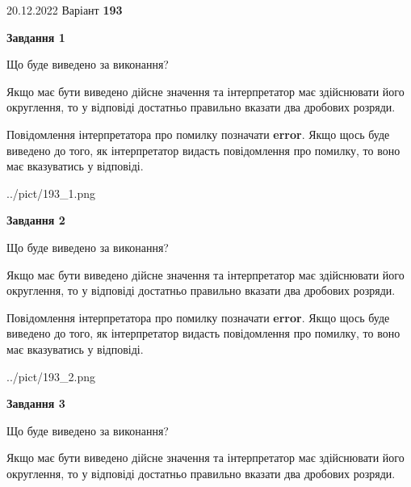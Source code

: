 \documentclass[12pt, ukrainian]{article}
\begin{document}
{20.12.2022 Варіант \No \textbf { 193 }\par}
{
\begin {Large}

{\begin {center}\textbf{Завдання 1}\end {center}}\par
Що буде виведено за виконання? \par

Якщо має бути виведено дійсне значення та інтерпретатор має здійснювати його округлення, 
то у відповіді достатньо правильно вказати два дробових розряди.

Повідомлення інтерпретатора про помилку позначати \textbf{error}.
Якщо щось буде виведено до того, як інтерпретатор видасть повідомлення про помилку, 
то воно має вказуватись у відповіді. \par

\begin{center}
	{../pict/193_1.png}
\end{center}
\newpage

{\begin {center}\textbf{Завдання 2}\end {center}}\par
Що буде виведено за виконання? \par

Якщо має бути виведено дійсне значення та інтерпретатор має здійснювати його округлення, 
то у відповіді достатньо правильно вказати два дробових розряди.

Повідомлення інтерпретатора про помилку позначати \textbf{error}.
Якщо щось буде виведено до того, як інтерпретатор видасть повідомлення про помилку, 
то воно має вказуватись у відповіді. \par

\begin{center}
	{../pict/193_2.png}
\end{center}
\newpage

{\begin {center}\textbf{Завдання 3}\end {center}}\par
Що буде виведено за виконання? \par

Якщо має бути виведено дійсне значення та інтерпретатор має здійснювати його округлення, 
то у відповіді достатньо правильно вказати два дробових розряди.


\end{Large}}
\end{document}
